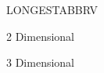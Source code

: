 \begin{theglossary}{LONGESTABBRV}

\item [ABRREVIATONS]
\item[] 

\item[2D] 2 Dimensional
\item[3D] 3 Dimensional 

\end{theglossary}

